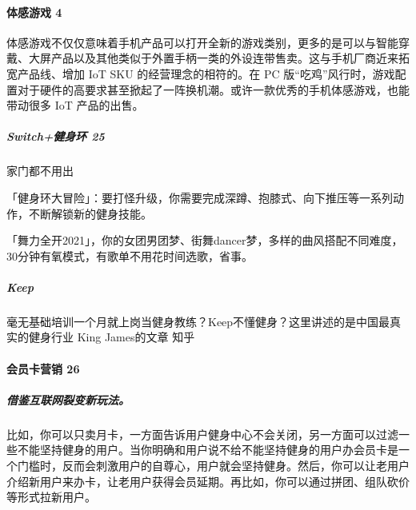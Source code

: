 \documentclass[letterpaper,10pt,english]{sphinxmanual}
\begin{document}
\paragraph{体感游戏 4\sphinxfootnotemark[780]}
\label{\detokenize{chapter_project/AI_fit:id14}}%
\begin{footnotetext}[780]\sphinxAtStartFootnote
{}
%
\end{footnotetext}\ignorespaces 
体感游戏不仅仅意味着手机产品可以打开全新的游戏类别，更多的是可以与智能穿戴、大屏产品以及其他类似于外置手柄一类的外设连带售卖。这与手机厂商近来拓宽产品线、增加
IoT SKU 的经营理念的相符的。在 PC
版“吃鸡”风行时，游戏配置对于硬件的高要求甚至掀起了一阵换机潮。或许一款优秀的手机体感游戏，也能带动很多
IoT 产品的出售。


\subparagraph{Switch+健身环 25\sphinxfootnotemark[781]}
\label{\detokenize{chapter_project/AI_fit:switch-25}}%
\begin{footnotetext}[781]\sphinxAtStartFootnote
{}
%
\end{footnotetext}\ignorespaces 
家门都不用出

「健身环大冒险」：要打怪升级，你需要完成深蹲、抱膝式、向下推压等一系列动作，不断解锁新的健身技能。

「舞力全开2021」，你的女团男团梦、街舞dancer梦，多样的曲风搭配不同难度，30分钟有氧模式，有歌单不用花时间选歌，省事。


\subparagraph{Keep}
\label{\detokenize{chapter_project/AI_fit:keep}}
毫无基础培训一个月就上岗当健身教练？Keep不懂健身？这里讲述的是中国最真实的健身行业
\sphinxhyphen{} King James的文章 \sphinxhyphen{} 知乎 


\paragraph{会员卡营销 26\sphinxfootnotemark[782]}
\label{\detokenize{chapter_project/AI_fit:id15}}%
\begin{footnotetext}[782]\sphinxAtStartFootnote
{}
%
\end{footnotetext}\ignorespaces 

\subparagraph{借鉴互联网裂变新玩法。}
\label{\detokenize{chapter_project/AI_fit:id16}}
比如，你可以只卖月卡，一方面告诉用户健身中心不会关闭，另一方面可以过滤一些不能坚持健身的用户。当你明确和用户说不给不能坚持健身的用户办会员卡是一个门槛时，反而会刺激用户的自尊心，用户就会坚持健身。然后，你可以让老用户介绍新用户来办卡，让老用户获得会员延期。再比如，你可以通过拼团、组队砍价等形式拉新用户。
\end{document}
